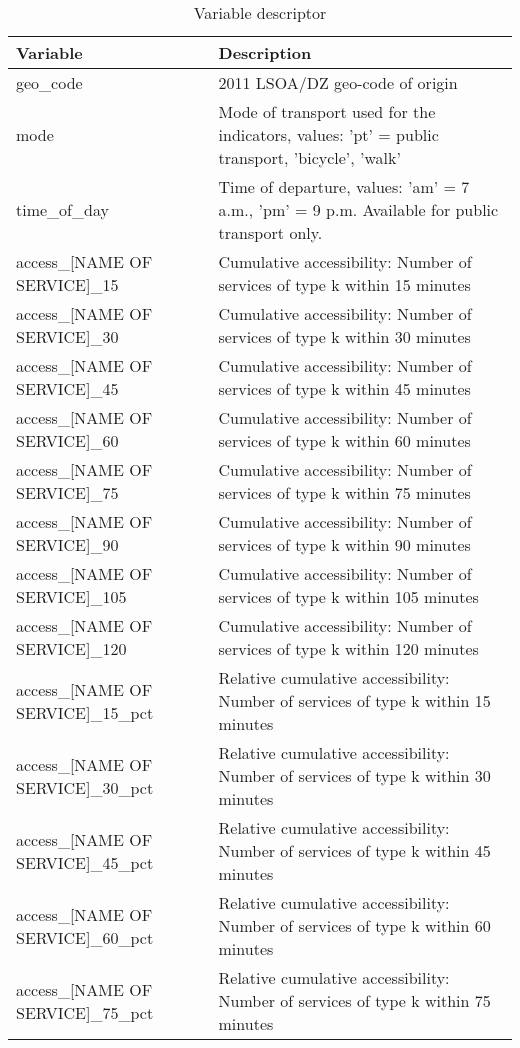 \documentclass{article}
\begin{document}
\begin{table}[!h]

\caption{\label{tab:unnamed-chunk-5}Variable descriptor}
\centering
\begin{tabu} to 
\toprule
Variable & Description\\
\midrule
geo\_code & 2011 LSOA/DZ geo-code of origin\\
mode & Mode of transport used for the indicators, values: 'pt' = public transport, 'bicycle', 'walk'\\
time\_of\_day & Time of departure, values: 'am' = 7 a.m., 'pm' = 9 p.m. Available for public transport only.\\
access\_[NAME OF SERVICE]\_15 & Cumulative accessibility: Number of services of type k within 15 minutes\\
access\_[NAME OF SERVICE]\_30 & Cumulative accessibility: Number of services of type k within 30 minutes\\
\addlinespace
access\_[NAME OF SERVICE]\_45 & Cumulative accessibility: Number of services of type k within 45 minutes\\
access\_[NAME OF SERVICE]\_60 & Cumulative accessibility: Number of services of type k within 60 minutes\\
access\_[NAME OF SERVICE]\_75 & Cumulative accessibility: Number of services of type k within 75 minutes\\
access\_[NAME OF SERVICE]\_90 & Cumulative accessibility: Number of services of type k within 90 minutes\\
access\_[NAME OF SERVICE]\_105 & Cumulative accessibility: Number of services of type k within 105 minutes\\
\addlinespace
access\_[NAME OF SERVICE]\_120 & Cumulative accessibility: Number of services of type k within 120 minutes\\
access\_[NAME OF SERVICE]\_15\_pct & Relative cumulative accessibility: Number of services of type k within 15 minutes\\
access\_[NAME OF SERVICE]\_30\_pct & Relative cumulative accessibility: Number of services of type k within 30 minutes\\
access\_[NAME OF SERVICE]\_45\_pct & Relative cumulative accessibility: Number of services of type k within 45 minutes\\
access\_[NAME OF SERVICE]\_60\_pct & Relative cumulative accessibility: Number of services of type k within 60 minutes\\
\addlinespace
access\_[NAME OF SERVICE]\_75\_pct & Relative cumulative accessibility: Number of services of type k within 75 minutes\\

\end{tabu}
\end{table}
\end{document}
